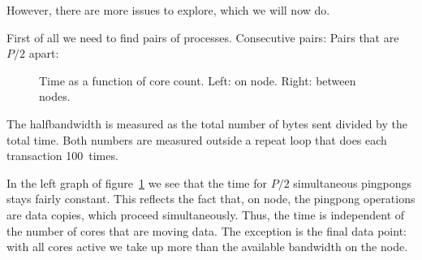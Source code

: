 However, there are more issues to explore,
which we will now do.

First of all we need to find pairs of processes.
Consecutive pairs:
Pairs that are $P/2$ apart:

\begin{figure}[ht]
  \pgfplotsset{width=3.5in,compat=1.7}
  \hbox\bgroup %

  \egroup %
  \caption{Time as a function of core count. Left: on node. Right: between nodes.}
  \label{fig:hbw-interintra}
\end{figure}

The halfbandwidth is measured as the total number of bytes sent
divided by the total time.
Both numbers are measured outside a repeat loop that does each
transaction 100~times.
%

In the left graph of figure~\ref{fig:hbw-interintra} we see that the time
for $P/2$ simultaneous pingpongs stays fairly constant.
This reflects the fact that, on node, the pingpong operations are
data copies, which proceed simultaneously.
Thus, the time is independent of the number of cores that are moving data.
The exception is the final data point: with all cores active we take up
more than the available bandwidth on the node.

